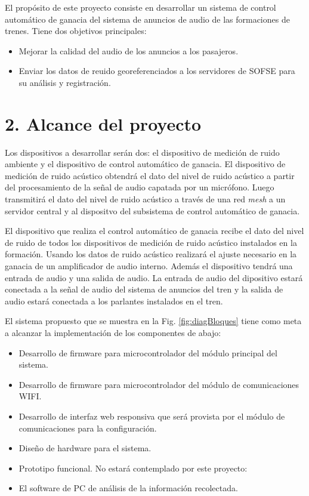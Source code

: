 \documentclass[11pt]{charter}
\begin{document}
El propósito de este proyecto consiste en desarrollar un sistema de control automático de ganacia del sistema de anuncios de audio de las formaciones de trenes. Tiene dos objetivos principales:
\begin{itemize}
\item Mejorar la calidad del audio de los anuncios a los pasajeros.
\item Enviar los datos de reuido georeferenciados a los servidores de SOFSE para su análisis y registración.
\end{itemize}

\section{2. Alcance del proyecto}
\label{sec:alcance}

Los dispositivos a desarrollar serán dos: el dispositivo de medición de ruido ambiente y el dispositivo de control automático de ganacia.
El dispositivo de medición de ruido acústico obtendrá el dato del nivel de ruido acústico a partir del procesamiento de la señal de audio capatada por un micrófono. Luego transmitirá el dato del nivel de ruido acústico a través de una red {\em mesh\/} a un servidor central y al dispositvo del subsistema de control automático de ganacia.

El dispositivo que realiza el control automático de ganacia recibe el dato del nivel de ruido de todos los dispositivos de medición de ruido acústico instalados en la formación. Usando los datos de ruido acústico realizará el ajuste necesario en la ganacia de un amplificador de audio interno. Además el dispositivo tendrá una entrada de audio y una salida de audio. La entrada de audio del dipositivo estará conectada a la señal de audio del sistema de anuncios del tren y la salida de audio estará conectada a los parlantes instalados en el tren.

El sistema propuesto que se muestra en la Fig. \ref{fig:diagBloques} tiene  como meta a alcanzar  la implementación de los componentes de abajo:

\begin{itemize}
\item Desarrollo de firmware para microcontrolador del módulo principal del sistema.
\item Desarrollo de firmware para microcontrolador del módulo de comunicaciones WIFI.
\item Desarrollo de interfaz web responsiva que será provista por el módulo de comunicaciones
para la configuración.
\item Diseño de hardware para el sistema.
\item Prototipo funcional.
No estará contemplado por este proyecto:
\item El software de PC de análisis de la información recolectada.
\end{itemize}
\end{document}
